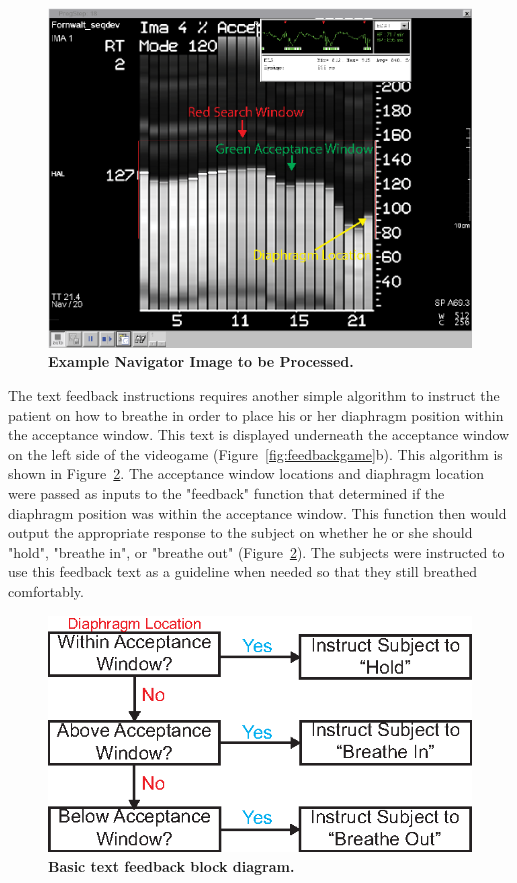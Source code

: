 	\begin{figure}
		\centering
		\includegraphics{figures/gamepaper/10-navImageProcessing}
		\caption[Example Navigator Image to be Processed]{\textbf{Example Navigator Image to be Processed.}}
		\label{fig:navImageProcessing}
	\end{figure}

	The text feedback instructions requires another simple algorithm to instruct the patient on how to breathe in order to place his or her diaphragm position within the acceptance window. This text is displayed underneath the acceptance window on the left side of the videogame (Figure~\ref{fig:feedbackgame}b). This algorithm is shown in Figure~\ref{fig:feedbackblockdiagram}. The acceptance window locations and diaphragm location were passed as inputs to the "feedback" function that determined if the diaphragm position was within the acceptance window. This function then would output the appropriate response to the subject on whether he or she should "hold", "breathe in", or "breathe out" (Figure~\ref{fig:feedbackblockdiagram}). The subjects were instructed to use this feedback text as a guideline when needed so that they still breathed comfortably.
	
	\begin{figure}
		\centering
		\includegraphics{figures/gamepaper/11-feedbackFunctionDiagram}
		\caption[Basic text feedback block diagram]{\textbf{Basic text feedback block diagram.}}
		\label{fig:feedbackblockdiagram}
	\end{figure}

